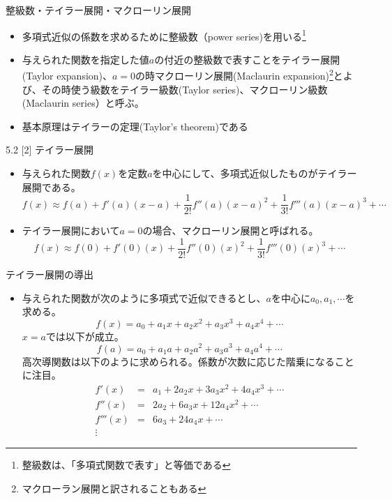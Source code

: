 \begin{slide}{整級数・テイラー展開・マクローリン展開}
\begin{itemize}
\item 多項式近似の係数を求めるために整級数（power series)を用いる\footnote{整級数は、「多項式関数で表す」と等価である}
\item 与えられた関数を指定した値$a$の付近の整級数で表すことをテイラー展開(Taylor expansion)、$a=0$の時マクローリン展開(Maclaurin expansion)\footnote{マクローラン展開と訳されることもある}とよび、その時使う級数をテイラー級数(Taylor series)、マクローリン級数(Maclaurin series）と呼ぶ。
\item 基本原理はテイラーの定理(Taylor's theorem)である
\end{itemize}
\end{slide}
\begin{slide}{5.2 [2] テイラー展開}
\begin{itemize}
\item 与えられた関数$f(x)$を定数$a$を中心にして、多項式近似したものがテイラー展開である。
\begin{equation}
f(x) \approx f(a) + f'(a)(x-a) + \frac{1}{2!}f''(a)(x-a)^2 + \frac{1}{3!}f'''(a)(x-a)^3 + \cdots \label{eq:taylorseries}
\end{equation}
\item テイラー展開において$a=0$の場合、マクローリン展開と呼ばれる。
\begin{equation}
f(x) \approx f(0) + f'(0)(x) + \frac{1}{2!}f''(0)(x)^2 + \frac{1}{3!}f'''(0)(x)^3 + \cdots \label{eq:macseries}
\end{equation}
\end{itemize}
\end{slide}
\begin{slide}{テイラー展開の導出}
\begin{itemize}
\item 与えられた関数が次のように多項式で近似できるとし、$a$を中心に$a_0, a_1, \cdots$を求める。
\begin{equation}
f(x) =  a_0 + a_1 x + a_2x^2 + a_3 x^3 + a_4x^4 +\cdots \label{eq:taylor}
\end{equation}
$x=a$では以下が成立。
\begin{equation}
f(a) =  a_0 + a_1 a + a_2a^2 + a_3 a^3 + a_4a^4 +\cdots  \nonumber 
\end{equation}
高次導関数は以下のように求められる。係数が次数に応じた階乗になることに注目。
\begin{eqnarray}
f'(x) &=& a_1 + 2a_2x+ 3a_3 x^2 + 4a_4x^3+\cdots \nonumber \\
f''(x) &=& 2a_2 + 6a_3 x + 12 a_4x^2 + \cdots \nonumber \\
f'''(x) &=& 6a_3 + 24 a_4 x + \cdots \nonumber \\
\vdots \label{eq:higherderivatives}
\end{eqnarray}
\end{itemize}
\end{slide}
